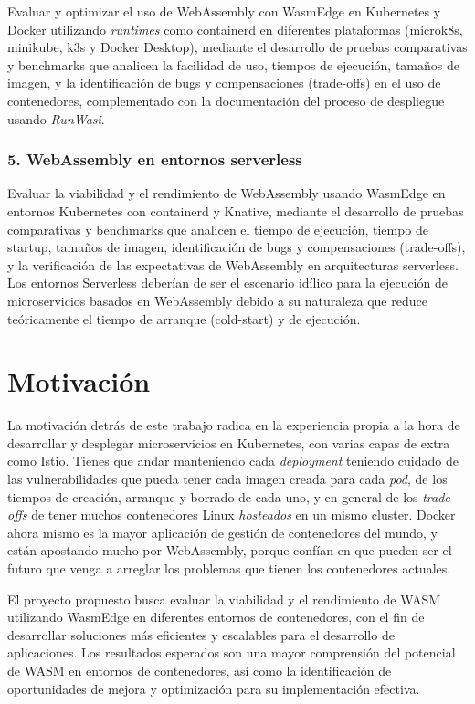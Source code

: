 Evaluar y optimizar el uso de WebAssembly con WasmEdge en Kubernetes y Docker utilizando \textit{runtimes} como containerd en diferentes plataformas (microk8s, minikube, k3s y Docker Desktop), mediante el desarrollo de pruebas comparativas y benchmarks que analicen la facilidad de uso, tiempos de ejecución, tamaños de imagen, y la identificación de bugs y compensaciones (trade-offs) en el uso de contenedores, complementado con la documentación del proceso de despliegue usando \textit{RunWasi}.

\subsubsection{5. WebAssembly en entornos serverless}

Evaluar la viabilidad y el rendimiento de WebAssembly usando WasmEdge en entornos Kubernetes con containerd y Knative, mediante el desarrollo de pruebas comparativas y benchmarks que analicen el tiempo de ejecución, tiempo de startup, tamaños de imagen, identificación de bugs y compensaciones (trade-offs), y la verificación de las expectativas de WebAssembly en arquitecturas serverless. Los entornos Serverless deberían de ser el escenario idílico para la ejecución de microservicios basados en WebAssembly debido a su naturaleza que reduce teóricamente el tiempo de arranque (cold-start) y de ejecución.

\section{Motivación}

La motivación detrás de este trabajo radica en la experiencia propia a la hora de desarrollar y desplegar microservicios en Kubernetes, con varias capas de extra como Istio. Tienes que andar manteniendo cada \textit{deployment} teniendo cuidado de las vulnerabilidades que pueda tener cada imagen creada para cada \textit{pod}, de los tiempos de creación, arranque y borrado de cada uno, y en general de los \textit{trade-offs} de tener muchos contenedores Linux \textit{hosteados} en un mismo cluster. Docker ahora mismo es la mayor aplicación de gestión de contenedores del mundo, y están apostando mucho por WebAssembly, porque confían en que pueden ser el futuro que venga a arreglar los problemas que tienen los contenedores actuales. 

El proyecto propuesto busca evaluar la viabilidad y el rendimiento de WASM utilizando WasmEdge en diferentes entornos de contenedores, con el fin de desarrollar soluciones más eficientes y escalables para el desarrollo de aplicaciones. Los resultados esperados son una mayor comprensión del potencial de WASM en entornos de contenedores, así como la identificación de oportunidades de mejora y optimización para su implementación efectiva.

